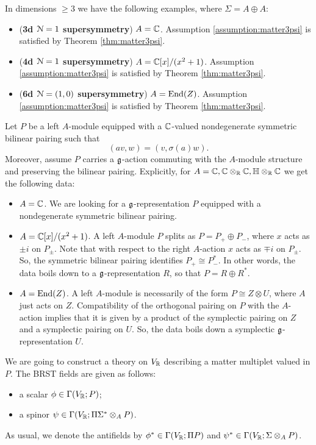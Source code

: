 \documentclass[10pt, oneside]{article}
\begin{document}
In dimensions $\geq 3$ we have the following examples, where $\Sigma = A \oplus A$:

\begin{itemize}

\item (\textbf{3d $\mathcal N=1$ supersymmetry}) $A = \mathbb C$. Assumption \ref{assumption:matter3psi} is satisfied by Theorem \ref{thm:matter3psi}.

\item (\textbf{4d $\mathcal N=1$ supersymmetry}) $A = \mathbb C[x]/(x^2+1)$. Assumption \ref{assumption:matter3psi} is satisfied by Theorem \ref{thm:matter3psi}.

\item (\textbf{6d $\mathcal N=(1, 0)$ supersymmetry}) $A = \operatorname{End}(Z)$. Assumption \ref{assumption:matter3psi} is satisfied by Theorem \ref{thm:matter3psi}.
\end{itemize}

Let $P$ be a left $A$-module equipped with a $\mathbb C$-valued nondegenerate symmetric bilinear pairing such that
\[(av, w) = (v, \sigma(a)w).\]
Moreover, assume $P$ carries a $\mathfrak g$-action commuting with the $A$-module structure and preserving the bilinear pairing. Explicitly, for $A=\mathbb C, \mathbb C\otimes_\mathbb R\mathbb C, \mathbb{H}\otimes_\mathbb R\mathbb C$ we get the following data:
\begin{itemize}
\item $A=\mathbb C$. We are looking for a $\mathfrak g$-representation $P$ equipped with a nondegenerate symmetric bilinear pairing.

\item $A=\mathbb C[x]/(x^2+1)$. A left $A$-module $P$ splits as $P=P_+\oplus P_-$, where $x$ acts as $\pm i$ on $P_{\pm}$. Note that with respect to the right $A$-action $x$ acts as $\mp i$ on $P_{\pm}$. So, the symmetric bilinear pairing identifies $P_+\cong P_-^*$. In other words, the data boils down to a $\mathfrak g$-representation $R$, so that $P = R\oplus R^*$.

\item $A=\operatorname{End}(Z)$. A left $A$-module is necessarily of the form $P\cong Z\otimes U$, where $A$ just acts on $Z$. Compatibility of the orthogonal pairing on $P$ with the $A$-action implies that it is given by a product of the symplectic pairing on $Z$ and a symplectic pairing on $U$. So, the data boils down a symplectic $\mathfrak g$-representation $U$.
\end{itemize}

We are going to construct a theory on $V_\mathbb R$ describing a matter multiplet valued in $P$. The BRST fields are given as follows:
\begin{itemize}
\item a scalar $\phi\in\Gamma(V_\mathbb R; P)$;
\item a spinor $\psi\in\Gamma(V_\mathbb R; \Pi \Sigma^*\otimes_A P)$.
\end{itemize}
As usual, we denote the antifields by $\phi^*\in\Gamma(V_\mathbb R; \Pi P)$ and $\psi^*\in\Gamma(V_\mathbb R; \Sigma\otimes_A P)$.
\end{document}

